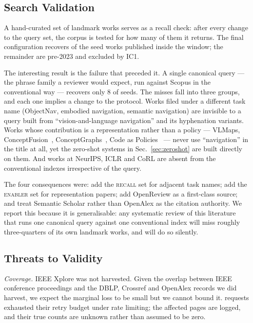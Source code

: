 \documentclass[journal]{IEEEtran}
\begin{document}
\subsection{Search Validation}\label{sec:validation}
A hand-curated set of \SeedTotal{} landmark works serves as a recall check:
after every change to the query set, the corpus is tested for how many of
them it returns. The final configuration recovers \RecallWindow{} of the
seed works published inside the window; the remainder are pre-2023 and
excluded by IC1.

The interesting result is the failure that preceded it. A single canonical
query --- the phrase family a reviewer would expect, run against Scopus in
the conventional way --- recovers only 8 of \SeedTotal{} seeds. The misses
fall into three groups, and each one implies a change to the protocol.
Works filed under a different task name (ObjectNav, embodied navigation,
semantic navigation) are invisible to a query built from
``vision-and-language navigation'' and its hyphenation variants. Works whose
contribution is a representation rather than a policy ---
VLMaps, ConceptFusion~\cite{jatavallabhula2023conceptfusion},
ConceptGraphs~\cite{gu2024conceptgraphs}, Code as
Policies~\cite{liang2023code} --- never use ``navigation'' in the title at
all, yet the zero-shot systems in Sec.~\ref{sec:zeroshot} are built
directly on them. And works at NeurIPS, ICLR and CoRL are absent from the
conventional indexes irrespective of the query.

The four consequences were: add the \textsc{recall} set for adjacent task
names; add the \textsc{enabler} set for representation papers; add
OpenReview as a first-class source; and treat Semantic Scholar rather than
OpenAlex as the citation authority. We report this because it is
generalisable: any systematic review of this literature that runs one
canonical query against one conventional index will miss roughly
three-quarters of its own landmark works, and will do so silently.

\subsection{Threats to Validity}\label{sec:threats}
\emph{Coverage.} IEEE Xplore was not harvested. Given the overlap between
IEEE conference proceedings and the DBLP, Crossref and OpenAlex records we
did harvest, we expect the marginal loss to be small but we cannot bound
it. \FailedRequests{} requests exhausted their retry budget under rate
limiting; the affected pages are logged, and their true counts are unknown
rather than assumed to be zero.
\end{document}
